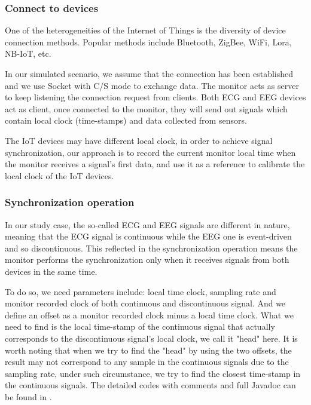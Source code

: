 \documentclass[11pt, oneside]{article}   	%
\begin{document}
\subsubsection{Connect to devices}
\indent \par One of the heterogeneities of the Internet of Things is the diversity of device connection methods. Popular methods include Bluetooth, ZigBee, WiFi, Lora, NB-IoT, etc. \\
\indent \par In our simulated scenario, we assume that the connection has been established and we use Socket with C/S mode to exchange data. The monitor acts as server to keep listening the connection request from clients. Both ECG and EEG devices act as client, once connected to the monitor, they will send out signals which contain local clock (time-stamps) and data collected from sensors. \\
\indent \par The IoT devices may have different local clock, in order to achieve signal synchronization, our approach is to record the current monitor local time when the monitor receives a signal's first data, and use it as a reference to calibrate the local clock of the IoT devices.

\subsubsection{Synchronization operation}
\indent \par In our study case, the so-called ECG and EEG signals are different in nature, meaning that the ECG signal is continuous while the EEG one is event-driven and so discontinuous. This reflected in the synchronization operation means the monitor performs the synchronization only when it receives signals from both devices in the same time. \\
\indent \par To do so, we need parameters include: local time clock, sampling rate and monitor recorded clock of both continuous and discontinuous signal. And we define an offset as a monitor recorded clock minus a local time clock. What we need to find is the local time-stamp of the continuous signal that actually corresponds to the discontinuous signal's local clock, we call it "head" here. It is worth noting that when we try to find the "head" by using the two offsets, the result may not correspond to any sample in the continuous signals due to the sampling rate, under such circumstance, we try to find the closest time-stamp in the continuous signals. The detailed codes with comments and full Javadoc can be found in \cite{ref22}.
\end{document}
